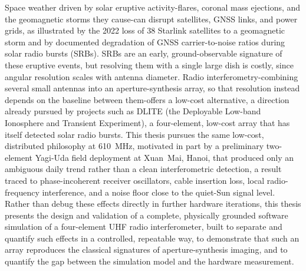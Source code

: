 \documentclass[12pt,a4paper,oneside]{report}
\begin{document}
Space weather driven by solar eruptive activity-flares, coronal mass ejections, and
the geomagnetic storms they cause-can disrupt satellites, GNSS links, and power
grids, as illustrated by the 2022 loss of 38 Starlink satellites to a geomagnetic
storm and by documented degradation of GNSS carrier-to-noise ratios during solar
radio bursts (SRBs). SRBs are an early, ground-observable signature of these
eruptive events, but resolving them with a single large dish is costly, since
angular resolution scales with antenna diameter. Radio interferometry-combining
several small antennas into an aperture-synthesis array, so that resolution instead
depends on the baseline between them-offers a low-cost alternative, a direction
already pursued by projects such as DLITE (the Deployable Low-band Ionosphere and
Transient Experiment), a four-element, low-cost array that has itself detected solar
radio bursts. This thesis pursues the same low-cost, distributed philosophy at
\SI{610}{\mega\hertz}, motivated in part by a preliminary two-element Yagi-Uda field
deployment at Xuan~Mai, Hanoi, that produced only an ambiguous daily trend rather
than a clean interferometric detection, a result traced to phase-incoherent receiver
oscillators, cable insertion loss, local radio-frequency interference, and a noise
floor close to the quiet-Sun signal level. Rather than debug these effects directly
in further hardware iterations, this thesis presents the design and validation of a
complete, physically grounded software simulation of a four-element UHF radio
interferometer, built to separate and quantify such effects in a controlled,
repeatable way, to demonstrate that such an array reproduces the classical
signatures of aperture-synthesis imaging, and to quantify the gap between the
simulation model and the hardware measurement.
\end{document}
